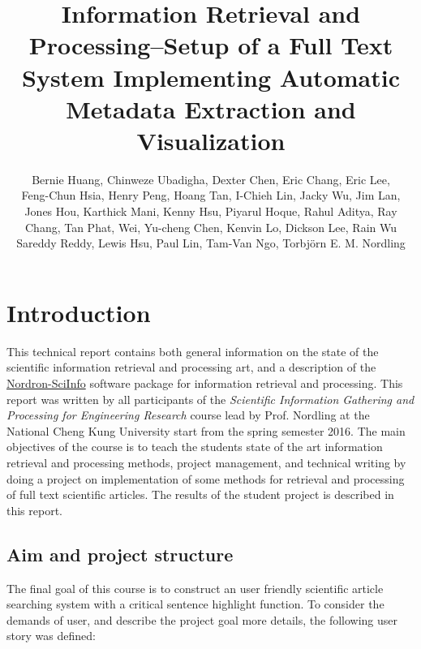 \documentclass[a4paper,twocolumn,twoside]{article}
\begin{document}
 
	
	\title{Information Retrieval and Processing--Setup of a Full Text System Implementing Automatic Metadata Extraction and Visualization}
	\author{Bernie Huang, Chinweze Ubadigha, Dexter Chen, Eric Chang, Eric Lee, \\
		Feng-Chun Hsia, Henry Peng, Hoang Tan, I-Chieh Lin, Jacky Wu, Jim Lan, \\
		Jones Hou, Karthick Mani, Kenny Hsu, Piyarul Hoque, Rahul Aditya, Ray \\
		Chang, Tan Phat, Wei, Yu-cheng Chen, Kenvin Lo, Dickson Lee, Rain Wu\\
		 Sareddy Reddy, Lewis Hsu, Paul Lin, Tam-Van Ngo, Torbj\"{o}rn E. M. Nordling}  %
	\maketitle   
	
	\section{Introduction}
	\label{Introduction}
	
	This technical report contains both general information on the state of the scientific information retrieval and processing art, and a description of the \href{https://bitbucket.org/nordron/nordron-sciinfo}{Nordron-SciInfo} software package for information retrieval and processing. 
	This report was written by all participants of the \emph{Scientific Information Gathering and Processing for Engineering Research} course lead by Prof. Nordling at the National Cheng Kung University start from the spring semester 2016.
	The main objectives of the course is to teach the students state of the art information retrieval and processing methods, project management, and technical writing by doing a project on implementation of some methods for retrieval and processing of full text scientific articles.
	The results of the student project is described in this report.
	
	\subsection{Aim and project structure}
	\label{aim}

	
	The final goal of this course is to construct an user friendly scientific article searching system with a critical sentence highlight function.
	To consider the demands of user, and describe the project goal more details, the following user story was defined:
	
\end{document}
